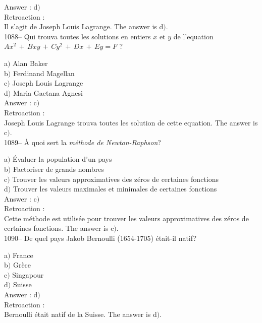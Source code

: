 ﻿\documentclass[letterpaper, 12pt]{article}
\begin{document}
Answer : d$)$\\

Retroaction : \\
Il s'agit de Joseph Louis Lagrange.
The answer is d$)$.\\

1088-- Qui trouva toutes les solutions en entiers $x$ et $y$ de
l'equation $Ax^2\,+\,Bxy\,+\,Cy^2\,+\,Dx\,+\,Ey=F$ ?

a$)$ Alan Baker \\
b$)$ Ferdinand Magellan \\
c$)$ Joseph Louis Lagrange \\
d$)$ Maria Gaetana Agnesi\\

Answer : c$)$\\

Retroaction : \\
Joseph Louis Lagrange trouva toutes les solution de cette
equation.
The answer is c$)$.\\

1089-- \`A quoi sert la {\sl m\'ethode de Newton-Raphson}?

a$)$ \'Evaluer la population d'un pays \\
b$)$ Factoriser de grands nombres \\
c$)$ Trouver les valeurs approximatives des z\'eros de certaines fonctions
\\
d$)$ Trouver les valeurs maximales et minimales de certaines fonctions\\

Answer : c$)$\\

Retroaction : \\
Cette m\'ethode est utilis\'ee pour trouver les valeurs
approximatives des z\'eros de certaines fonctions. The answer is
c$)$.\\

1090-- De quel pays Jakob Bernoulli (1654-1705) \'etait-il natif?

a$)$ France  \\
b$)$ Gr\`ece  \\
c$)$ Singapour \\
d$)$ Suisse\\

Answer : d$)$\\

Retroaction : \\
Bernoulli \'etait natif de la Suisse.
The answer is d$)$.\\
\end{document}

